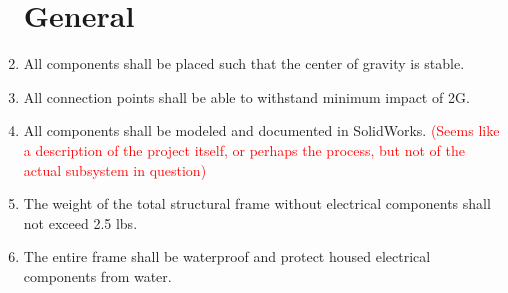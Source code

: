 \documentclass{article}
\begin{document}
	\begin{enumerate}
		
		\section{General}
		
		\item All components shall be placed such that the center of gravity is stable.\\
		\item All connection points shall be able to withstand minimum impact of 2G.\\
		\item All components shall be modeled and documented in SolidWorks. \textcolor{red}{(Seems like a description of the project itself, or perhaps the process, but not of the actual subsystem in question)}\\
		\item The weight of the total structural frame without electrical components shall not exceed 2.5 lbs.\\
		\item The entire frame shall be waterproof and protect housed electrical components from water.\\
		
		
		
	\end{enumerate}
	
\end{document}
